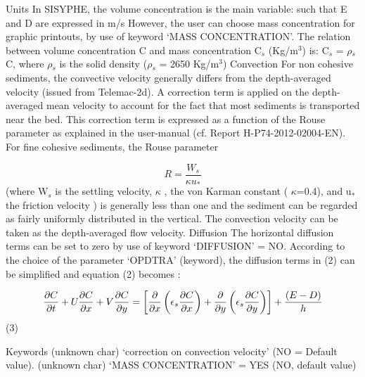 Units\newline
In SISYPHE, the volume concentration is the main variable: such that E and D
are expressed in m/s \newline
However, the user can choose mass concentration for graphic printouts, by
use of keyword `MASS CONCENTRATION'.\newline
The relation between volume concentration C and mass concentration C$_{s}$
(Kg/m$^{3}$) is: C$_{s}$ = $\rho$$_{s}$ C, where $\rho$$_{s}$ is the solid
density ($\rho$$_{s}$ = 2650 Kg/m$^{3}$)\newline
Convection\newline
For non cohesive sediments, the convective velocity generally differs from
the depth-averaged velocity (issued from Telemac-2d). A correction term is
applied on the depth-averaged mean velocity to account for the fact that
most sediments is transported near the bed. This correction term is
expressed as a function of the Rouse parameter as explained in the
user-manual (cf. Report H-P74-2012-02004-EN). \newline
For fine cohesive sediments, the Rouse parameter

\begin{equation*}
R=\frac{W_{s} }{\kappa u_{*}} 
\end{equation*}%
(where W$_{s}$ is the settling velocity, $\kappa$ , the von Karman constant (%
$\kappa$=0.4), and u$_{*}$ the friction velocity ) is generally less than
one and the sediment can be regarded as fairly uniformly distributed in the
vertical. The convection velocity can be taken as the depth-averaged flow
velocity.\newline
Diffusion\newline
The horizontal diffusion terms can be set to zero by use of keyword
`DIFFUSION' = NO.\newline
According to the choice of the parameter `OPDTRA' (keyword), the diffusion
terms in (2) can be simplified and equation (2) becomes :

\begin{equation*}
\frac{\partial C}{\partial t} +U_{} \frac{\partial C}{\partial x} +V\frac{%
\partial C}{\partial y} =\left[ \frac{\partial }{\partial x} \left( \epsilon
_{s} \frac{\partial C}{\partial x} \right) +\frac{\partial }{\partial y}
\left( \epsilon _{s} \frac{\partial C}{\partial y} \right) \right] +\frac{%
(E-D)}{h} 
\end{equation*}
(3)

Keywords\newline
(unknown char)\hspace{5mm} `correction on convection velocity' (NO = Default
value). \newline
(unknown char)\hspace{5mm} `MASS CONCENTRATION' = YES (NO, default value)

